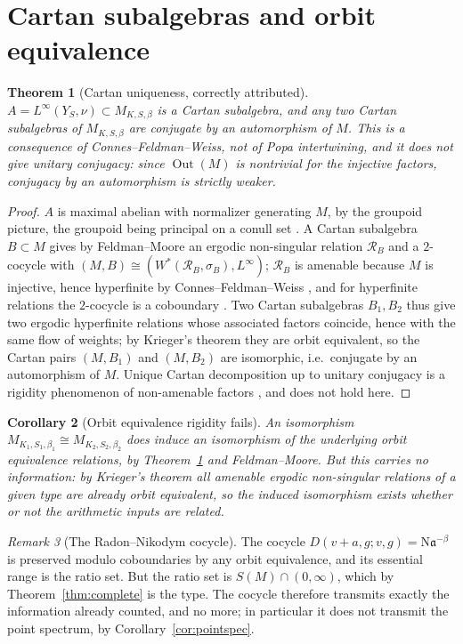 \documentclass[11pt]{amsart}
\numberwithin{equation}{section}
\newtheorem{theorem}{Theorem}[section]
\newtheorem{corollary}[theorem]{Corollary}
\theoremstyle{definition}
\theoremstyle{remark}
\newtheorem{remark}[theorem]{Remark}
\newcommand{\cR}{\mathcal{R}}
\newcommand{\aaa}{\mathfrak{a}}
\newcommand{\Ns}{\mathrm{N}}
\newcommand{\Out}{\operatorname{Out}}
\begin{document}
\section{Cartan subalgebras and orbit equivalence}

\begin{theorem}[Cartan uniqueness, correctly attributed]\label{thm:cartan}
$A=L^\infty(Y_S,\nu)\subset M_{K,S,\beta}$ is a Cartan subalgebra, and any two Cartan
subalgebras of $M_{K,S,\beta}$ are conjugate by an \emph{automorphism} of $M$. This is a
consequence of Connes--Feldman--Weiss, not of Popa intertwining, and it does \emph{not} give
unitary conjugacy: since $\Out(M)$ is nontrivial for the injective factors, conjugacy by an
automorphism is strictly weaker.
\end{theorem}

\begin{proof}
$A$ is maximal abelian with normalizer generating $M$, by the groupoid picture, the groupoid
being principal on a conull set \cite[Prop.~2.8]{Main}. A Cartan subalgebra $B\subset M$ gives
by Feldman--Moore \cite{FM} an ergodic non-singular relation $\cR_B$ and a $2$-cocycle with
$(M,B)\cong(W^*(\cR_B,\sigma_B),L^\infty)$; $\cR_B$ is amenable because $M$ is injective, hence
hyperfinite by Connes--Feldman--Weiss \cite{CFW}, and for hyperfinite relations the
$2$-cocycle is a coboundary \cite{FM}. Two Cartan subalgebras $B_1,B_2$ thus give two ergodic
hyperfinite relations whose associated factors coincide, hence with the same flow of weights;
by Krieger's theorem \cite{Krieger} they are orbit equivalent, so the Cartan pairs $(M,B_1)$
and $(M,B_2)$ are isomorphic, i.e.\ conjugate by an automorphism of $M$. Unique Cartan
decomposition up to unitary conjugacy is a rigidity phenomenon of non-amenable factors
\cite{Houdayer}, and does not hold here.
\end{proof}

\begin{corollary}[Orbit equivalence rigidity fails]\label{cor:oe}
An isomorphism $M_{K_1,S_1,\beta_1}\cong M_{K_2,S_2,\beta_2}$ does induce an isomorphism of
the underlying orbit equivalence relations, by Theorem~\ref{thm:cartan} and Feldman--Moore.
But this carries no information: by Krieger's theorem all amenable ergodic non-singular
relations of a given type are already orbit equivalent, so the induced isomorphism exists
whether or not the arithmetic inputs are related.
\end{corollary}

\begin{remark}[The Radon--Nikodym cocycle]\label{rem:rn}
The cocycle $D(v+a,g;v,g)=\Ns\aaa^{-\beta}$ is preserved modulo coboundaries by any orbit
equivalence, and its essential range is the ratio set. But the ratio set is
$S(M)\cap(0,\infty)$, which by Theorem~\ref{thm:complete} is the type. The cocycle therefore
transmits exactly the information already counted, and no more; in particular it does not
transmit the point spectrum, by Corollary~\ref{cor:pointspec}.
\end{remark}
\end{document}
